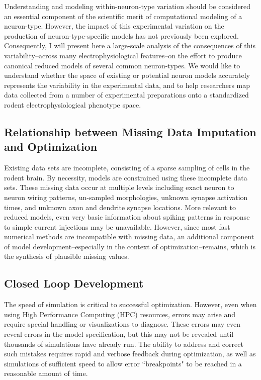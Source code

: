 Understanding and modeling within-neuron-type variation should be considered an essential component of the scientific merit of computational modeling of a neuron-type.
However, the impact of this experimental variation on the production of neuron-type-specific models has not previously been explored.
Consequently, I will present here a large-scale analysis of the consequences of this variability--across many electrophysiological features--on the effort to produce canonical reduced models of several common neuron-types.
We would like to understand whether the space of existing or potential neuron models accurately represents the variability in the experimental data, and to help researchers map data collected from a number of experimental preparations onto a standardized rodent electrophysiological phenotype space.

\subsection{Relationship between Missing Data Imputation and Optimization}
Existing data sets are incomplete, consisting of a sparse sampling of cells in the rodent brain. By necessity, models are constrained using these incomplete data sets.
These missing data occur at multiple levels including exact neuron to neuron wiring patterns, un-sampled morphologies, unknown synapse activation times, and unknown axon and dendrite synapse locations.
More relevant to reduced models, even very basic information about spiking patterns in response to simple current injections may be unavailable.
However, since most fast numerical methods are incompatible with missing data, an additional component of model development--especially in the context of optimization--remains, which is the synthesis of plausible missing values.

\subsection{Closed Loop Development}
The speed of simulation is critical to successful optimization. However, even when using High Performance Computing (HPC) resources, errors may arise and require special handling or visualizations to diagnose.  These errors may even reveal errors in the model specification, but this may not be revealed until thousands of simulations have already run.
The ability to address and correct such mistakes requires rapid and verbose feedback during optimization, as well as simulations of sufficient speed to allow error ``breakpoints" to be reached in a reasonable amount of time.

